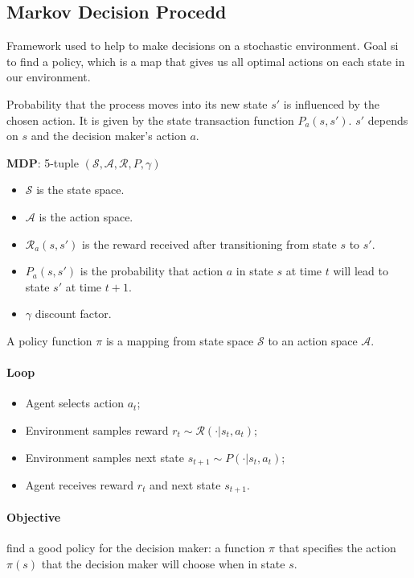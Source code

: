 \documentclass[a4paper,6pt,twocolumn,fleqn]{article}
\begin{document}
\subsection{Markov Decision Procedd} %
Framework used to help to make decisions on a stochastic environment. Goal si to find a policy, which is a map that gives us all optimal actions on each state in our environment.

Probability that the process moves into its new state \(s'\) is influenced by the chosen action. It is given by the state transaction function \(P_a(s,s')\). \(s'\) depends on \(s\) and the decision maker's action \(a\).

\textbf{MDP}: 5-tuple \((\mathcal S, \mathcal A, \mathcal R, P, \gamma)\)
\begin{itemize}
    \item \(\mathcal S\) is the state space.
    \item \(\mathcal A\) is the action space.
    \item \(\mathcal R_a(s,s')\) is the reward received after transitioning from state \(s\) to \(s'\).
    \item \(P_a(s,s')\) is the probability that action \(a\) in state \(s\) at time \(t\) will lead to state \(s'\) at time \(t+1\).
    \item \(\gamma\) discount factor.
\end{itemize}
A policy function \(\pi\) is a mapping from state space \(\mathcal S\) to an action space \(\mathcal A\).

\paragraph{Loop}
\begin{itemize}
    \item Agent selects action \(a_t\);
    \item Environment samples reward \(r_t \sim \mathcal R( \cdot | s_t, a_t)\);
    \item Environment samples next state \(s_{t+1} \sim P( \cdot | s_t, a_t)\);
    \item Agent receives reward \(r_t\) and next state \(s_{t+1}\).
\end{itemize}
\paragraph{Objective}
find a good policy for the decision maker: a function \(\pi\) that specifies the action \(\pi(s)\) that the decision maker will choose when in state \(s\).
\end{document}
